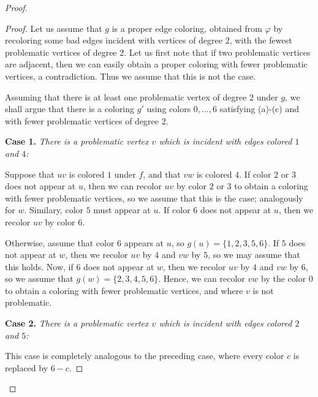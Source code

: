 \documentclass[10pt,a4paper]{amsart}
\begin{document}
\begin{proof}

\begin{proof}	
	Let us assume that $g$ is a proper edge coloring, obtained from $\varphi$ 
	by recoloring some bad edges incident with vertices of degree $2$,
	with the fewest problematic vertices of degree $2$.
	Let us first note that if two problematic vertices are adjacent, then we can easily obtain a proper coloring
	with fewer problematic vertices, a contradiction. Thus we assume that this is not the case.

	Assuming that there is at least one problematic vertex of degree $2$ under $g$,
	we shall argue that there is a coloring $g'$ using colors $0, \dots, 6$ satisfying (a)-(c) and with
	fewer problematic vertices of degree $2$.

\bigskip

	{\bf Case 1.} {\em There is a problematic vertex $v$ which is incident with edges colored $1$ and $4$:}

	Suppose that $uv$ is colored $1$ under $f$, and that $vw$ is colored $4$. If color $2$ or $3$ does
	not appear at $u$, then we can recolor $uv$ by color $2$ or $3$ to obtain a coloring with fewer
	problematic vertices, so we assume that this is the case; analogously for $w$. Similary, color $5$
	must appear at $u$. If color $6$ does not appear at $u$, then we recolor $uv$ by color $6$.

	Otherwise, assume that color $6$ appears at $u$, so $g(u)=\{1,2,3,5,6\}$. If $5$ does not appear
	at $w$, then we recolor $uv$ by $4$ and $vw$ by $5$, so we may assume that this holds. Now, if
	$6$ does not appear at $w$, then we recolor $uv$ by $4$ and $vw$ by $6$, so we assume that
	$g(w) = \{2,3,4,5,6\}$. Hence, we can recolor $vw$ by the color $0$ to obtain a coloring
	with fewer problematic vertices, and where $v$ is not problematic.

	\bigskip

	{\bf Case 2.}	 {\em There is a problematic vertex $v$ which is incident with edges colored $2$ and $5$:}
	
	This case is completely analogous to the preceding case, where every color $c$ is replaced by $6-c$.


\end{proof}
\end{proof}
\end{document}
